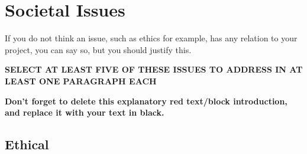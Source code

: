 \chapter{Societal Issues} %

\begin{tcolorbox}[      %
    boxrule=0pt,        %
    colback=white,      %
    coltext=red         %
]                       %
    If you do not think an issue, such as ethics for example, has any relation to your project, you can say so, but you should justify this. 
    \vspace{15pt}
    
    \textbf{SELECT AT LEAST FIVE OF THESE ISSUES TO ADDRESS IN AT LEAST ONE PARAGRAPH EACH}
    
    \vspace{15pt}       %
    \begin{center}      %
    \textbf{Don't forget to delete this explanatory red text/block introduction, and replace it with your text in black.}
    \end{center}        %
\end{tcolorbox}         %

\section{Ethical} %

